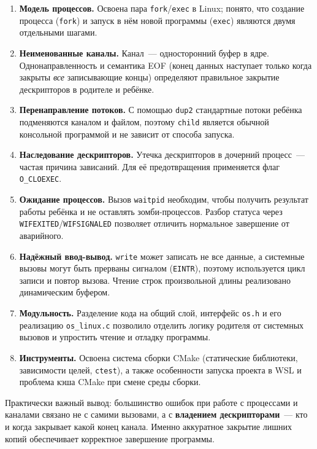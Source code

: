 \documentclass[11pt, a4paper]{article}
\begin{document}
\begin{enumerate}
  \item \textbf{Модель процессов.} Освоена пара \texttt{fork}/\texttt{exec}
        в Linux; понято, что создание процесса (\texttt{fork}) и запуск в нём
        новой программы (\texttt{exec}) являются двумя отдельными шагами.
  \item \textbf{Неименованные каналы.} Канал~--- односторонний буфер в
        ядре. Однонаправленность и семантика EOF (конец данных наступает
        только когда закрыты \textit{все} записывающие концы) определяют
        правильное закрытие дескрипторов в родителе и ребёнке.
  \item \textbf{Перенаправление потоков.} С помощью \texttt{dup2}
        стандартные потоки ребёнка
        подменяются каналом и файлом, поэтому \texttt{child} является обычной
        консольной программой и не зависит от способа запуска.
  \item \textbf{Наследование дескрипторов.} Утечка дескрипторов в
        дочерний процесс~--- частая причина зависаний. Для её
        предотвращения применяется флаг \texttt{O\_\allowbreak{}CLOEXEC}.
  \item \textbf{Ожидание процессов.} Вызов \texttt{waitpid} необходим, чтобы получить результат
        работы ребёнка и не оставлять зомби-процессов. Разбор статуса
        через \texttt{WIFEXITED}/\texttt{WIFSIGNALED} позволяет отличить
        нормальное завершение от аварийного.
  \item \textbf{Надёжный ввод-вывод.} \texttt{write} может записать не
        все данные, а системные вызовы могут быть прерваны сигналом
        (\texttt{EINTR}), поэтому используется цикл записи и повтор вызова.
        Чтение строк произвольной длины реализовано динамическим буфером.
  \item \textbf{Модульность.} Разделение кода на общий слой, интерфейс
        \texttt{os.h} и его реализацию \texttt{os\_\allowbreak{}linux.c} позволило отделить
        логику родителя от системных вызовов и упростить чтение и отладку
        программы.
  \item \textbf{Инструменты.} Освоена система сборки CMake (статические
        библиотеки, зависимости целей, \texttt{ctest}), а также
        особенности запуска проекта в WSL и проблема кэша CMake при смене
        среды сборки.
\end{enumerate}

Практически важный вывод: большинство ошибок при работе с процессами и
каналами связано не с самими вызовами, а с \textbf{владением
дескрипторами}~--- кто и когда закрывает какой конец канала. Именно
аккуратное закрытие лишних копий обеспечивает корректное завершение
программы.
\end{document}
